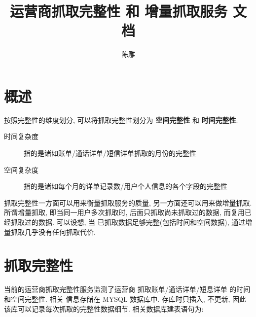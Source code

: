 \documentclass[UTF8, heading=true, schema=chinese]{ctexart}
\title{运营商抓取完整性 和 增量抓取服务 文档}
\author{陈雕}
\begin{document}
\maketitle
\newpage

\tableofcontents
\newpage


\section{概述}
按照完整性的维度划分, 可以将抓取完整性划分为 \textbf{空间完整性} 和 \textbf{时间完整性}.

\begin{description}
	\item[时间复杂度] 指的是诸如账单/通话详单/短信详单抓取的月份的完整性
	\item[空间复杂度] 指的是诸如每个月的详单记录数/用户个人信息的各个字段的完整性
\end{description}

抓取完整性一方面可以用来衡量抓取服务的质量, 另一方面还可以用来做增量抓取.  所谓增量抓取, 
即当同一用户多次抓取时, 后面只抓取尚未抓取过的数据, 而复用已经抓取过的数据. 可以设想, 当
已抓取数据足够完整(包括时间和空间数据), 通过增量抓取几乎没有任何抓取代价.

\section{抓取完整性}
当前的运营商抓取完整性服务监测了运营商 抓取账单/通话详单/短息详单 的时间和空间完整性. 相关
信息存储在 MYSQL 数据库中. 存库时只插入, 不更新, 因此该库可以记录每次抓取的完整性数据细节.
相关数据库建表语句为:
\end{document}
